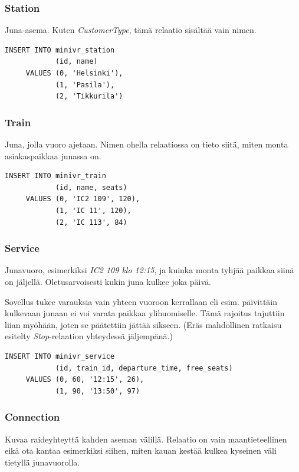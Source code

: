 \documentclass[a4paper,twoside,titlepage,12pt]{article}
\begin{document}
\subsubsection{Station}

Juna-asema. Kuten \emph{CustomerType}, tämä relaatio sisältää vain nimen.

\begin{lstlisting}
INSERT INTO minivr_station
            (id, name)
     VALUES (0, 'Helsinki'),
            (1, 'Pasila'),
            (2, 'Tikkurila')
\end{lstlisting}

\subsubsection{Train}

Juna, jolla vuoro ajetaan. Nimen ohella relaatiossa on tieto siitä, miten monta
asiakaspaikkaa junassa on.

\begin{lstlisting}
INSERT INTO minivr_train
            (id, name, seats)
     VALUES (0, 'IC2 109', 120),
            (1, 'IC 11', 120),
            (2, 'IC 113', 84)
\end{lstlisting}

\subsubsection{Service}

Junavuoro, esimerkiksi \emph{IC2 109 klo 12:15}, ja kuinka monta tyhjää paikkaa
siinä on jäljellä. Oletusarvoisesti kukin juna kulkee joka päivä.

Sovellus tukee varauksia vain yhteen vuoroon kerrallaan eli esim. päivittäin
kulkevaan junaan ei voi varata paikkaa ylihuomiselle. Tämä rajoitus tajuttiin
liian myöhään, joten se päätettiin jättää sikseen. (Eräs mahdollinen ratkaisu
esitelty \emph{Stop}-relaation yhteydessä jäljempänä.)

\begin{lstlisting}
INSERT INTO minivr_service
            (id, train_id, departure_time, free_seats)
     VALUES (0, 60, '12:15', 26),
            (1, 90, '13:50', 97)
\end{lstlisting}

\subsubsection{Connection}

Kuvaa raideyhteyttä kahden aseman välillä. Relaatio on vain maantieteellinen
eikä ota kantaa esimerkiksi siihen, miten kauan kestää kulkea kyseinen väli
tietyllä junavuorolla.
\end{document}
